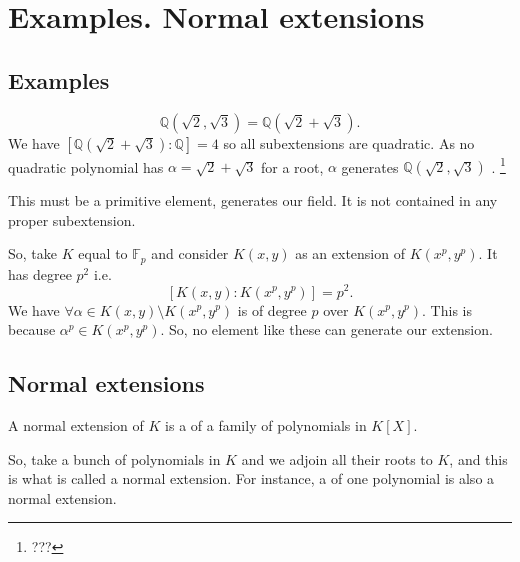 \section{Examples. Normal extensions}

\subsection{Examples}

\begin{example}
  \[
  \mathbb{Q}\left(\sqrt{2}, \sqrt{3}\right) =
  \mathbb{Q}\left(\sqrt{2} + \sqrt{3}\right).
  \]
  We have
  $\left[\mathbb{Q}\left(\sqrt{2} + \sqrt{3}\right) :
    \mathbb{Q}\right] = 4$ so all subextensions are quadratic. As no
  quadratic polynomial has $\alpha = \sqrt{2} + \sqrt{3}$ for a root,
  $\alpha$ generates $\mathbb{Q}\left(\sqrt{2}, \sqrt{3}\right)$
  .
  \footnote{
    ???
  }

  This must be a primitive element, generates our field. 
  It is not contained in any proper subextension. 
\end{example}

\begin{example}
  So, take $K$ equal to $\mathbb{F}_p$ and consider
  $K\left(x,y\right)$ as an
  extension of $K\left(x^p,y^p\right)$. It has degree $p^2$ i.e.
  \[
  \left[
    K\left(x,y\right) : K\left(x^p,y^p\right)
    \right] = p^2.
  \]
  We have $\forall \alpha \in K\left(x,y\right) \setminus
  K\left(x^p,y^p\right)$ is of degree $p$ over
  $K\left(x^p,y^p\right)$. This is because
  $\alpha^p \in K\left(x^p,y^p\right)$. So, no element like these can
  generate our extension.  
\end{example}

\subsection{Normal extensions}

\begin{definition}
  A normal extension of $K$ is a  of a
  family of polynomials in $K\left[X\right]$.
  \label{def:normalextension}
\end{definition}

\begin{remark}
  So, take a bunch of polynomials in $K$ and we adjoin all their roots
  to $K$, and this is what is called a normal extension.
  For instance, a  of one polynomial is
  also a normal extension. 
\end{remark}

